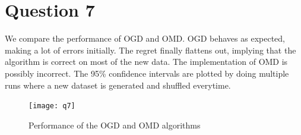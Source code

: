 \documentclass{article}
\begin{document}
\section*{Question 7}
We compare the performance of OGD and OMD. OGD behaves as expected, making a lot of errors initially. The regret finally flattens out, implying that the algorithm is correct on most of the new data. The implementation of OMD is possibly incorrect. The 95\% confidence intervals are plotted by doing multiple runs where a new dataset is generated and shuffled everytime.
\begin{figure}[h!]
\centering
\texttt{[image: q7]}
\caption{Performance of the OGD and OMD algorithms}
\end{figure}
%
%
%    
%
%
\end{document}
